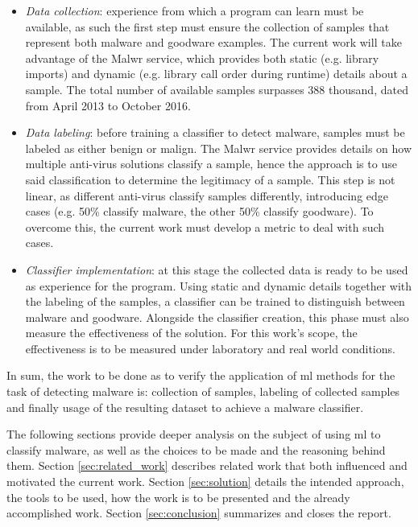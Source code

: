 \documentclass{llncs}
\begin{document}
\begin{itemize}
	\item \textit{Data collection}: experience from which a program can learn must be available, as such the first step must ensure the collection of samples that represent both malware and goodware examples. The current work will take advantage of the Malwr\cite{tool:malwr} service, which provides both static (e.g. library imports) and dynamic (e.g. library call order during runtime) details about a sample. The total number of available samples surpasses 388 thousand, dated from April 2013 to October 2016.
	\item \textit{Data labeling}: before training a classifier to detect malware, samples must be labeled as either benign or malign. The Malwr\cite{tool:malwr} service provides details on how multiple anti-virus solutions classify a sample, hence the approach is to use said classification to determine the legitimacy of a sample. This step is not linear, as different anti-virus classify samples differently, introducing edge cases (e.g. 50\% classify malware, the other 50\% classify goodware). To overcome this, the current work must develop a metric to deal with such cases.
	\item \textit{Classifier implementation}: at this stage the collected data is ready to be used as experience for the program. Using static and dynamic details together with the labeling of the samples, a classifier can be trained to distinguish between malware and goodware. Alongside the classifier creation, this phase must also measure the effectiveness of the solution. For this work's scope, the effectiveness is to be measured under laboratory and real world conditions.
\end{itemize}

In sum, the work to be done as to verify the application of \gls{ml} methods for the task of detecting malware is: collection of samples, labeling of collected samples and finally usage of the resulting dataset to achieve a malware classifier.

The following sections provide deeper analysis on the subject of using \gls{ml} to classify malware, as well as the choices to be made and the reasoning behind them. Section \ref{sec:related_work} describes related work that both influenced and motivated the current work. Section \ref{sec:solution} details the intended approach, the tools to be used, how the work is to be presented and the already accomplished work. Section \ref{sec:conclusion} summarizes and closes the report.
\end{document}
